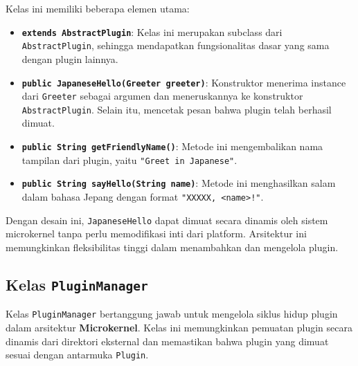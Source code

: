 \noindent
Kelas ini memiliki beberapa elemen utama:

\begin{itemize}
	\item \textbf{\texttt{extends AbstractPlugin}}: Kelas ini merupakan subclass dari \texttt{AbstractPlugin}, sehingga mendapatkan fungsionalitas dasar yang sama dengan plugin lainnya.
	\item \textbf{\texttt{public JapaneseHello(Greeter greeter)}}: Konstruktor menerima instance dari \texttt{Greeter} sebagai argumen dan meneruskannya ke konstruktor \texttt{AbstractPlugin}. Selain itu, mencetak pesan bahwa plugin telah berhasil dimuat.
	\item \textbf{\texttt{public String getFriendlyName()}}: Metode ini mengembalikan nama tampilan dari plugin, yaitu \texttt{"Greet in Japanese"}.
	\item \textbf{\texttt{public String sayHello(String name)}}: Metode ini menghasilkan salam dalam bahasa Jepang dengan format \texttt{"XXXXX, <name>!"}.
\end{itemize}

Dengan desain ini, \texttt{JapaneseHello} dapat dimuat secara dinamis oleh sistem microkernel tanpa perlu memodifikasi inti dari platform. Arsitektur ini memungkinkan fleksibilitas tinggi dalam menambahkan dan mengelola plugin.

\subsection{Kelas \texttt{PluginManager}}

Kelas \texttt{PluginManager} bertanggung jawab untuk mengelola siklus hidup plugin dalam arsitektur \textbf{Microkernel}. Kelas ini memungkinkan pemuatan plugin secara dinamis dari direktori eksternal dan memastikan bahwa plugin yang dimuat sesuai dengan antarmuka \texttt{Plugin}. 

